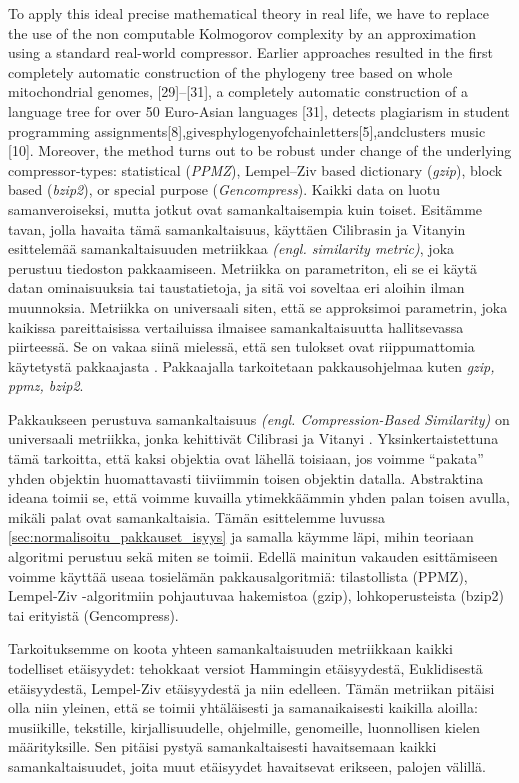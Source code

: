\documentclass[12pt,finnish,draft]{tktltiki2}
\theoremstyle{definition}
\theoremstyle{remark}
\newcommand{\engl}[1]{\emph{(engl. #1)}}
\begin{document}
  To apply this ideal precise mathematical theory in real life, we have to replace the use of the non computable Kolmogorov complexity by an approximation using a standard real-world compressor. Earlier approaches resulted in the first completely automatic construction of the phylogeny tree based on whole mitochondrial genomes, [29]–[31], a completely automatic construction of a language tree for over 50 Euro-Asian languages [31], detects plagiarism in student programming assignments[8],givesphylogenyofchainletters[5],andclusters music [10]. Moreover, the method turns out to be robust under change of the underlying compressor-types: statistical (\emph{PPMZ}), Lempel–Ziv based dictionary (\emph{gzip}), block based (\emph{bzip2}), or special purpose (\emph{Gencompress}).
\fi
\label{par:intro-1}
  Kaikki data on luotu samanveroiseksi, mutta jotkut ovat samankaltaisempia kuin toiset.
  Esitämme tavan, jolla havaita tämä samankaltaisuus, käyttäen Cilibrasin ja Vitanyin esittelemää samankaltaisuuden metriikkaa \engl{similarity metric}, joka perustuu tiedoston pakkaamiseen. \cite{CV05}
  Metriikka on parametriton, eli se ei käytä datan ominaisuuksia tai taustatietoja, ja sitä voi soveltaa eri aloihin ilman muunnoksia.
  Metriikka on universaali siten, että se approksimoi parametrin, joka kaikissa pareittaisissa vertailuissa ilmaisee samankaltaisuutta hallitsevassa piirteessä.
  Se on vakaa siinä mielessä, että sen tulokset ovat riippumattomia käytetystä pakkaajasta \cite{CV05}. Pakkaajalla tarkoitetaan pakkausohjelmaa kuten \emph{gzip, ppmz, bzip2}.


  \label{par:intro-2}
  Pakkaukseen perustuva samankaltaisuus \engl{Compression-Based Similarity} on universaali metriikka, jonka kehittivät Cilibrasi ja Vitanyi \cite{CV05}.
  Yksinkertaistettuna tämä tarkoitta, että kaksi objektia ovat lähellä toisiaan, jos voimme ``pakata'' yhden objektin huomattavasti tiiviimmin toisen objektin datalla.
  Abstraktina ideana toimii se, että voimme kuvailla ytimekkäämmin yhden palan toisen avulla, mikäli palat ovat samankaltaisia.
  Tämän esittelemme luvussa \ref{sec:normalisoitu_pakkauset_isyys} ja samalla käymme läpi, mihin teoriaan algoritmi perustuu sekä miten se toimii.
  Edellä mainitun vakauden esittämiseen voimme käyttää useaa tosielämän pakkausalgoritmiä: tilastollista (PPMZ), Lempel-Ziv -algoritmiin pohjautuvaa hakemistoa (gzip), lohkoperusteista (bzip2) tai erityistä (Gencompress).


  Tarkoituksemme on koota yhteen samankaltaisuuden metriikkaan kaikki todelliset etäisyydet: tehokkaat versiot Hammingin etäisyydestä, Euklidisestä etäisyydestä, Lempel-Ziv etäisyydestä ja niin edelleen.
  Tämän metriikan pitäisi olla niin yleinen, että se toimii yhtäläisesti ja samanaikaisesti kaikilla aloilla: musiikille, tekstille, kirjallisuudelle, ohjelmille, genomeille, luonnollisen kielen määrityksille.
  Sen pitäisi pystyä samankaltaisesti havaitsemaan kaikki samankaltaisuudet, joita muut etäisyydet havaitsevat erikseen, palojen välillä.
\end{document}
